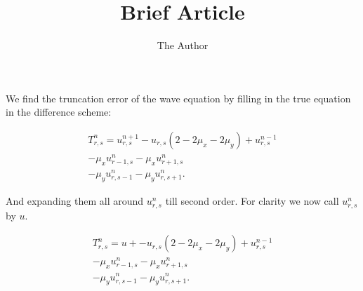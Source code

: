 \documentclass[11pt, oneside]{article}   	%
\title{Brief Article}
\author{The Author}
\begin{document}
\maketitle
We find the truncation error of the wave equation by filling in the true equation in the difference scheme:

\begin{align*}
T_{r,s}^n = u_{r,s}^{n+1} - u_{r,s}(2 - 2\mu_x - 2 \mu_y) + u_{r,s}^{n-1} \\
				 - \mu_x u_{r-1,s}^n - \mu_x u_{r+1,s}^n	  \\
				 - \mu_y u_{r,s-1}^n - \mu_y u_{r,s+1}^n.
\end{align*}

And expanding them all around $u_{r,s}^n$ till second order. For clarity we now call $u_{r,s}^n$ by $u$.

\begin{align*}
T_{r,s}^n = u +  - u_{r,s}(2 - 2\mu_x - 2 \mu_y) + u_{r,s}^{n-1} \\
				 - \mu_x u_{r-1,s}^n - \mu_x u_{r+1,s}^n	  \\
				 - \mu_y u_{r,s-1}^n - \mu_y u_{r,s+1}^n.
\end{align*}
\end{document}
